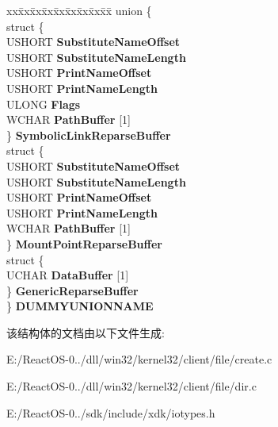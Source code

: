 \begin{DoxyCompactItemize}
\begin{tabbing}
\end{tabbing}\item 
\mbox{\label{struct___r_e_p_a_r_s_e___d_a_t_a___b_u_f_f_e_r_ad622f2bf7d4d2829bed07a7a92a414b6}} 
\begin{tabbing}
xx\=xx\=xx\=xx\=xx\=xx\=xx\=xx\=xx\=\kill
union \{\\
\>struct \{\\
\>\>USHORT {\bfseries SubstituteNameOffset}\\
\>\>USHORT {\bfseries SubstituteNameLength}\\
\>\>USHORT {\bfseries PrintNameOffset}\\
\>\>USHORT {\bfseries PrintNameLength}\\
\>\>ULONG {\bfseries Flags}\\
\>\>WCHAR {\bfseries PathBuffer} \mbox{[}1\mbox{]}\\
\>\} {\bfseries SymbolicLinkReparseBuffer}\\
\>struct \{\\
\>\>USHORT {\bfseries SubstituteNameOffset}\\
\>\>USHORT {\bfseries SubstituteNameLength}\\
\>\>USHORT {\bfseries PrintNameOffset}\\
\>\>USHORT {\bfseries PrintNameLength}\\
\>\>WCHAR {\bfseries PathBuffer} \mbox{[}1\mbox{]}\\
\>\} {\bfseries MountPointReparseBuffer}\\
\>struct \{\\
\>\>UCHAR {\bfseries DataBuffer} \mbox{[}1\mbox{]}\\
\>\} {\bfseries GenericReparseBuffer}\\
\} {\bfseries DUMMYUNIONNAME}\\

\end{tabbing}\end{DoxyCompactItemize}


该结构体的文档由以下文件生成\+:\begin{DoxyCompactItemize}
\item 
E\+:/\+React\+O\+S-\/0../dll/win32/kernel32/client/file/create.\+c\item 
E\+:/\+React\+O\+S-\/0../dll/win32/kernel32/client/file/dir.\+c\item 
E\+:/\+React\+O\+S-\/0../sdk/include/xdk/iotypes.\+h\end{DoxyCompactItemize}
